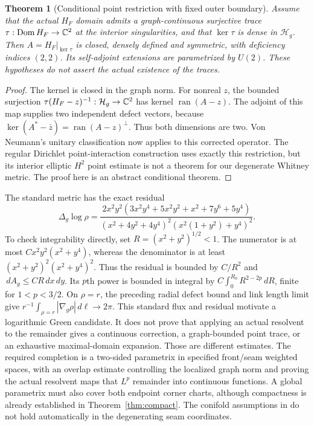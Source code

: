 \documentclass[11pt]{article}
\theoremstyle{readable}
\newtheorem{theorem}{Theorem}[section]
\theoremstyle{remark}\newtheorem{remark}[theorem]{Remark}
\newcommand{\dd}{\,d}\newcommand{\norm}[1]{\left\lVert#1\right\rVert}
\newcommand{\Dom}{\operatorname{Dom}}\newcommand{\spec}{\operatorname{spec}}
\begin{document}
\begin{theorem}[Conditional point restriction with fixed outer boundary]\label{thm:conditional}
Assume that the actual $H_F$ domain admits a graph-continuous surjective
trace $\tau:\Dom H_F\to\C^2$ at the interior singularities, and that
$\ker\tau$ is dense in $\mathcal H_g$. Then
$A=H_F|_{\ker\tau}$ is closed, densely defined and symmetric, with
deficiency indices $(2,2)$. Its self-adjoint extensions are parametrized by
$U(2)$. These hypotheses do not assert the actual existence of the traces.
\end{theorem}
\begin{proof}
The kernel is closed in the graph norm. For nonreal $z$, the bounded
surjection $\tau(H_F-z)^{-1}:\mathcal H_g\to\mathbb C^2$ has kernel
$\operatorname{ran}(A-z)$. The adjoint of this map supplies two independent
defect vectors, because
$\ker(A^*-\bar z)=\operatorname{ran}(A-z)^\perp$. Thus both dimensions
are two. Von Neumann's unitary classification now applies to this corrected
operator. The regular Dirichlet point-interaction construction
\cite[Proposition 2.1 and Theorem 2.2]{point} uses exactly this restriction,
but its interior elliptic $H^2$ point estimate is not a theorem for our
degenerate Whitney metric. The proof here is an abstract conditional theorem.
\end{proof}

The standard metric has the exact residual
\[
 \Delta_g\log\rho=
 \frac{2x^2y^2(3x^2y^4+5x^2y^2+x^2+7y^6+5y^4)}
 {(x^2+4y^2+4y^4)^2(x^2(1+y^2)+y^4)^2}.
\]
To check integrability directly, set $R=(x^2+y^2)^{1/2}<1$.
The numerator is at most $C x^2y^2(x^2+y^4)$, whereas the denominator
is at least $(x^2+y^2)^2(x^2+y^4)^2$. Thus the residual is bounded by
$C/R^2$ and $\dd A_g\leq C R\dd x\dd y$.
Its $p$th power is bounded in integral by
$C\int_0^{R_0}R^{2-2p}\dd R$, finite for $1<p<3/2$.
On $\rho=r$, the preceding radial defect bound and link length limit give
$r^{-1}\int_{\rho=r}|\nabla_g\rho|\dd\ell\to2\pi$.
This standard flux and residual motivate a logarithmic Green
candidate. It does not prove that applying an actual resolvent to the
remainder gives a continuous correction, a graph-bounded point trace,
or an exhaustive maximal-domain expansion. Those are different estimates.
The required completion is a two-sided parametrix in specified front/seam
weighted spaces, with an overlap estimate controlling the localized graph
norm and proving the actual resolvent maps that $L^p$ remainder into
continuous functions. A global parametrix must also cover both endpoint
corner charts, although compactness is already established in
Theorem~\ref{thm:compact}. The conifold assumptions in \cite{pacini} do not hold
automatically in the degenerating seam coordinates.
\end{document}
